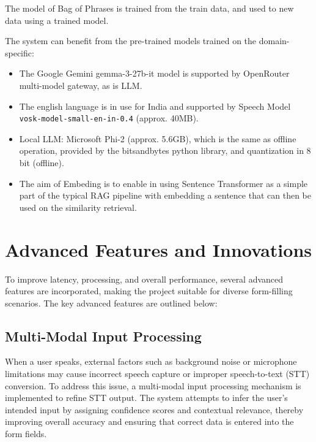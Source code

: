 \documentclass[conference]{IEEEtran}
\begin{document}
The model of Bag of Phrases is trained from the train data, and used to new data using a trained model.

The system can benefit from the pre-trained models trained on the domain-specific:

\begin{itemize}

    \item The Google Gemini gemma-3-27b-it model is supported by OpenRouter multi-model gateway, as is LLM.

    \item The english language is in use for India and supported by Speech Model \texttt{vosk-model-small-en-in-0.4} (approx. 40MB).

    \item Local LLM: Microsoft Phi-2 (approx. 5.6GB), which is the same as offline operation, provided by the bitsandbytes python library, and quantization in 8 bit (offline).

    \item The aim of Embeding is to enable in using Sentence Transformer as a simple part of the typical RAG pipeline with embedding a sentence that can then be used on the similarity retrieval.

\end{itemize}

\section{Advanced Features and Innovations}

To improve latency, processing, and overall performance, several advanced features are incorporated, making the project suitable for diverse form-filling scenarios. The key advanced features are outlined below:

\subsection{Multi-Modal Input Processing}
When a user speaks, external factors such as background noise or microphone limitations may cause incorrect speech capture or improper speech-to-text (STT) conversion. To address this issue, a multi-modal input processing mechanism is implemented to refine STT output. The system attempts to infer the user’s intended input by assigning confidence scores and contextual relevance, thereby improving overall accuracy and ensuring that correct data is entered into the form fields.
\end{document}
